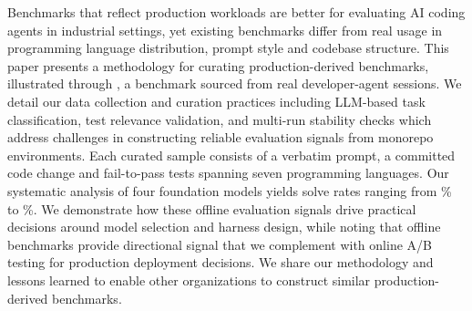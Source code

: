 Benchmarks that reflect production workloads are better for evaluating AI coding agents in industrial settings, yet existing benchmarks differ from real usage in programming language distribution, prompt style and codebase structure.
This paper presents a methodology for curating production-derived benchmarks, illustrated through \benchmark{}, a benchmark sourced from real developer-agent sessions.
We detail our data collection and curation practices including LLM-based task classification, test relevance validation, and multi-run stability checks which address challenges in constructing reliable evaluation signals from monorepo environments.
Each curated sample consists of a verbatim prompt, a committed code change and fail-to-pass tests spanning seven programming languages.
Our systematic analysis of four foundation models yields solve rates ranging from \SolveRateLowest{}\% to \SolveRateHighest{}\%. We demonstrate how these offline evaluation signals drive practical decisions around model selection and harness design, while noting that offline benchmarks provide directional signal that we complement with online A/B testing for production deployment decisions.
We share our methodology and lessons learned to enable other organizations to construct similar production-derived benchmarks.
